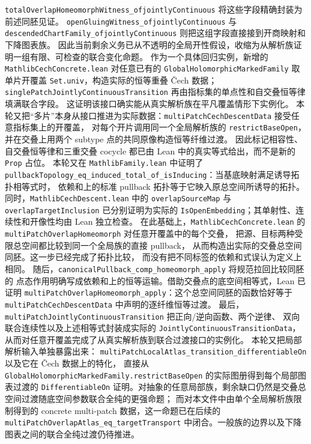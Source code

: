 \documentclass[UTF8,fontset=none,a4paper,11pt]{ctexart}
\begin{document}
\texttt{totalOverlapHomeomorphWitness\_of\allowbreak jointlyContinuous} 将这些字段精确封装为前述同胚见证。
\texttt{openGluingWitness\_of\allowbreak jointlyContinuous} 与
\texttt{descendedChartFamily\_of\allowbreak jointlyContinuous} 则把这组字段直接接到开商映射和下降图表族。
因此当前剩余义务已从不透明的全局开性假设，收缩为从解析族证明一组有限、可检查的联合变化命题。
作为一个具体回归实例，新增的 \texttt{MathlibCechConcrete.lean} 对任意已有的
\texttt{GlobalHolomorphicMarkedFamily} 取单片开覆盖 \texttt{Set.univ}，构造实际的恒等重叠 Čech 数据；
\texttt{singlePatchJointlyContinuousTransition} 再由指标集的单点性和自交叠恒等律填满联合字段。
这证明该接口确实能从真实解析族在平凡覆盖情形下实例化。
本轮又把“多片”本身从接口推进为实际数据：\texttt{multiPatchCechDescentData} 接受任意指标集上的开覆盖，
对每个开片调用同一个全局解析族的 \texttt{restrictBaseOpen}，并在交叠上用两个 subtype 点的共同原像构造恒等纤维过渡。
因此标记相容性、自交叠恒等律和三重交叠 cocycle 都已由 Lean 中的真实等式给出，而不是新的 \texttt{Prop} 占位。
本轮又在 \texttt{MathlibFamily.lean} 中证明了
\texttt{pullbackTopology\_eq\_induced\_total\_of\_isInducing}：当基底映射满足诱导拓扑相等式时，
依赖和上的标准 pullback 拓扑等于它映入原总空间所诱导的拓扑。
同时，\texttt{MathlibCechDescent.lean} 中的
\texttt{overlapSourceMap} 与 \texttt{overlapTargetInclusion} 已分别证明为实际的
\texttt{IsOpenEmbedding}；其单射性、连续性和开像性均由 Lean 独立检查。
在此基础上，\texttt{MathlibCechConcrete.lean} 的
\texttt{multiPatchOverlapHomeomorph} 对任意开覆盖中的每个交叠，
把源、目标两种受限总空间都比较到同一个全局族的直接 pullback，
从而构造出实际的交叠总空间同胚。这一步已经完成了拓扑比较，
而没有把不同标签的依赖和式误认为定义上相同。
随后，\texttt{canonicalPullback\_comp\_homeomorph\_apply} 将规范拉回比较同胚的
点态作用明确写成依赖和上的恒等运输。借助交叠点的底空间相等式，Lean 已证明
\texttt{multiPatchOverlapHomeomorph\_apply}：这个总空间同胚的函数恰好等于
\texttt{multiPatchCech\allowbreak DescentData} 中声明的逐纤维恒等过渡。
\enlargethispage{2\baselineskip}
最后，\texttt{multiPatchJointlyContinuous\allowbreak Transition} 把正向/逆向函数、两个逆律、
双向联合连续性以及上述相等式封装成实际的
\texttt{JointlyContinuous\allowbreak TransitionData}，从而对任意开覆盖完成了从真实解析族到联合过渡接口的实例化。
本轮又把局部解析输入单独暴露出来：
\texttt{multiPatchLocalAtlas\_transition\_differentiableOn} 以及它在 Čech 数据上的特化，
直接从 \texttt{GlobalHolomorphicMarkedFamily.restrictBaseOpen} 的实际图册得到每个局部图表过渡的
\texttt{DifferentiableOn} 证明。对抽象的任意局部族，剩余缺口仍然是交叠总空间过渡随底空间参数联合全纯的更强命题；
而对本文件中由单个全局解析族限制得到的 concrete multi-patch 数据，这一命题已在后续的
\texttt{multiPatchOverlapAtlas\_eq\_targetTransport} 中闭合。一般族的边界以及下降图表之间的联合全纯过渡仍待推进。
\end{document}
